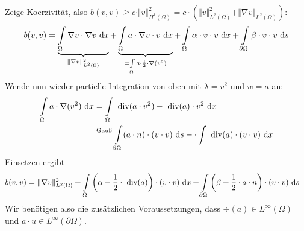 \documentclass[12pt,a4paper]{article}
\begin{document}
\begin{lösung}
Zeige Koerzivität, also $b(v,v)\geq c\cdot\Vert v\Vert^2_{H^1(\Omega)}=c\cdot\left(\Vert v\Vert^2_{L^2(\Omega)}+\Vert \nabla v\Vert_{L^2(\Omega)}\right)$:
\begin{align*}
b(v,v)&=\underbrace{\int\limits_\Omega\nabla v\cdot\nabla v \text{ d} x}_{\Vert \nabla v\Vert^2_{L^2(\Omega)}}+\underbrace{\int\limits_\Omega a\cdot\nabla v\cdot v\text{ d} x}_{=\int\limits_\Omega a\cdot\frac{1}{2}\cdot\nabla(v^2)}+\int\limits_\Omega\alpha\cdot v\cdot v\text{ d} x +\int\limits_{\partial\Omega}\beta\cdot v\cdot v\text{ d} s\\
\end{align*}
Wende nun wieder partielle Integration von oben mit $\lambda=v^2$ und $w=a$ an:
\begin{align*}
	\int\limits_\Omega a \cdot \nabla (v^2) \text{ d} x
&=\int\limits_\Omega\text{ div}(a\cdot v^2)-\text{ div}(a)\cdot v^2\text{ d} x\\
&\stackrel{\text{Gauß}}{=}
\int\limits_{\partial\Omega}(a\cdot n)\cdot(v\cdot v)\text{ d} s-\cdot\int\limits\text{ div}(a)\cdot(v\cdot v)\text{ d} x\\
\end{align*}
Einsetzen ergibt
\begin{align*}
&b(v,v)=\Vert\nabla v\Vert^2_{L^2(\Omega)}+\int\limits_\Omega\left(\alpha-\frac{1}{2}\cdot\text{ div}(a)\right)\cdot(v\cdot v)\text{ d} x
+\int\limits_{\partial\Omega}\left(\beta+\frac{1}{2}\cdot a\cdot n\right)\cdot(v\cdot v)\text{ d} s
\end{align*}
Wir benötigen also die zusätzlichen Voraussetzungen, dass $\div(a)\in L^\infty(\Omega)$ und $a\cdot u\in L^\infty(\partial\Omega)$.\\


\end{lösung}
\end{document}
